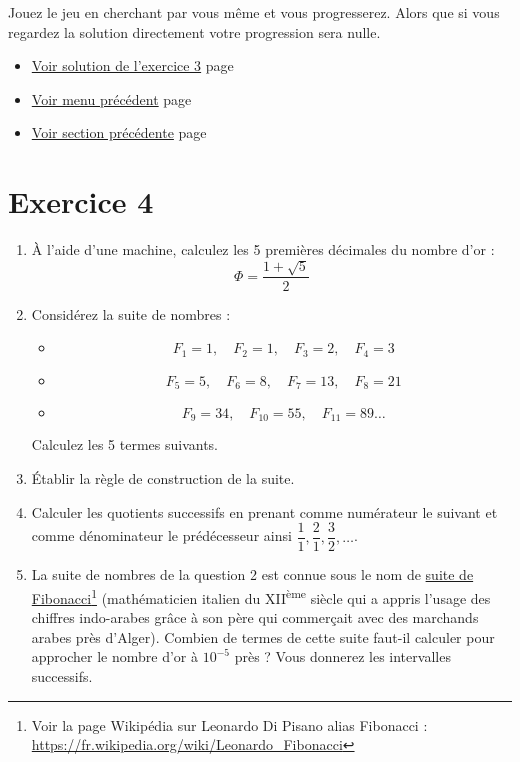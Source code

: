 \documentclass[a4paper,11pt]{book}
\begin{document}
Jouez le jeu en cherchant par vous même et vous progresserez. Alors que
si vous regardez la solution directement votre progression sera nulle.


\begin{itemize}
\item \hyperref[org34f5627]{Voir solution de l'exercice 3}
page~\pageref{page:sec8.2.1sol3}
\item \hyperref[org6170d36]{Voir menu précédent}
page~\pageref{page:content2-menu}
\item \hyperref[orgac3c6cf]{Voir section précédente}
page~\pageref{page:sec2.2.1intro-intervalle}
\end{itemize}

\clearpage

\section{Exercice 4}
\label{sec:org41534db}
\label{org6c6db0c}
\label{page:sec2.2.3exo4}


\begin{enumerate}
\item À l'aide d'une machine, calculez les 5 premières décimales
du nombre d'or :
\[\Phi = \dfrac{1 + \sqrt{5}}{2}\]
\item Considérez la suite de nombres :
\begin{itemize}
\item \[F_1 = 1,\quad F_2 = 1,\quad  F_3 = 2,\quad  F_4 = 3\]
\item \[F_5 = 5,\quad F_6 = 8,\quad F_7 = 13,\quad F_8 = 21\]
\item \[F_9 = 34,\quad F_{10} = 55,\quad F_{11} = 89\dots\]
\end{itemize}
Calculez les 5 termes suivants.
\item Établir la règle de construction de la suite.
\item Calculer les quotients successifs en prenant comme numérateur le
suivant et comme dénominateur le prédécesseur ainsi \(\dfrac{1}{1},
   \dfrac{2}{1}, \dfrac{3}{2},\dots\).
\item La suite de nombres de la question 2 est connue sous le nom de
\href{https://fr.wikipedia.org/wiki/Suite\_de\_Fibonacci}{suite de Fibonacci}\footnote{Voir la page Wikipédia sur Leonardo Di Pisano alias
Fibonacci : \url{https://fr.wikipedia.org/wiki/Leonardo\_Fibonacci}} (mathématicien italien du XII\textsuperscript{ème}
siècle qui a appris l'usage des chiffres indo-arabes grâce à son
père qui commerçait avec des marchands arabes près
d'Alger). Combien de termes de cette suite faut-il calculer pour
approcher le nombre d'or à \(10^{-5}\) près ? Vous donnerez les
intervalles successifs.
\end{enumerate}
\end{document}
